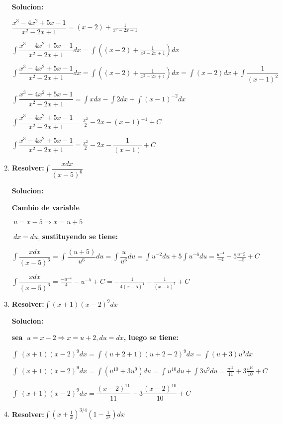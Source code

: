 \documentclass[10pt,a4paper]{book}
\newcommand{\ds}{\displaystyle}
\begin{document}
\begin{enumerate}
        \textbf{Solucion:}

        $\ds\dfrac{x^3-4x^2+5x-1}{x^2-2x+1}=(x-2)+\frac{1}{x^2-2x+1}$
        
        $\ds\int\dfrac{x^3-4x^2+5x-1}{x^2-2x+1}dx=\int\left((x-2)+\frac{1}{x^2-2x+1}\right)dx$

        $\ds\int\dfrac{x^3-4x^2+5x-1}{x^2-2x+1}dx=\int\left((x-2)+\frac{1}{x^2-2x+1}\right)dx=\int(x-2)dx
        +\int \dfrac{1}{(x-1)^2}$ 

        $\ds\int\dfrac{x^3-4x^2+5x-1}{x^2-2x+1}=\int xdx-\int 2dx+\int(x-1)^{-2}dx$

        $\ds\int\dfrac{x^3-4x^2+5x-1}{x^2-2x+1}=\frac{x^2}{2}-2x-(x-1)^{-1}+C$ 

        $\ds\int\dfrac{x^3-4x^2+5x-1}{x^2-2x+1}=\frac{x^2}{2}-2x-\dfrac{1}{(x-1)}+C$
        
    \vspace{0.5cm}
    \item \textbf{Resolver:}$\ds\int\dfrac{xdx}{(x-5)^6}$
    
        \textbf{Solucion:}

        \textbf{Cambio de variable} 

        $\ds\ u=x-5\Rightarrow x=u+5$

        $\ds\ dx=du$, \textbf{sustituyendo se tiene:} 

        $\ds\int\dfrac{xdx}{(x-5)^6}=\ds\int\dfrac{(u+5)}{u^6}du=\int\dfrac{u}{u^6}du=\int u^{-2}du+5
        \int u^{-6}du=\frac{u^{-4}}{-4}+5\frac{u^-5}{-5}+C $

        $\ds\int\dfrac{xdx}{(x-5)^6}=\frac{-u^{-4}}{4}-u^{-5}+C=-\frac{1}{4(x-5)^4}-\frac{1}{(x-5)^5}+C$
        
    \vspace{0.5cm}
    \item \textbf{Resolver:}$\ds\int (x+1)(x-2)^9dx$
    
        \textbf{Solucion:}

        \textbf{sea $\ds\ u=x-2 \Rightarrow x=u+2,du=dx$, luego se tiene:}
         
        $\ds\int\ (x+1)(x-2)^9dx=\int(u+2+1)(u+2-2)^9dx=\int(u+3)u^9dx$

        $\ds\int\ (x+1)(x-2)^9dx=\int(u^10+3u^9)du=\int u^10du+\int3u^9du=\frac{u^11}{11}+3\frac{u^10}{10}+C$
        
        $\ds\int\ (x+1)(x-2)^9dx=\dfrac{(x-2)^11}{11}+3\dfrac{(x-2)^10}{10}+C$

    \vspace{0.5cm}
    \item \textbf{Resolver:}$\ds\int\left(x+\frac{1}{x} \right)^{3/4}\left(1-\frac{1}{x^2} \right)dx$
    

\end{enumerate}
\end{document}

